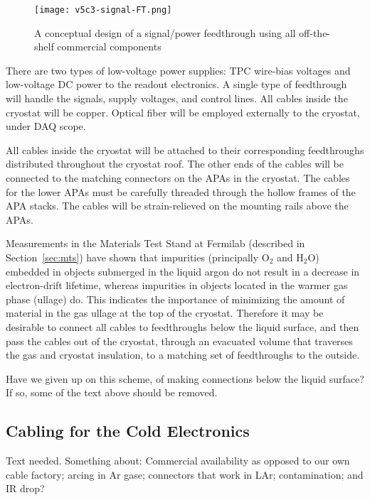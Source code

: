 \begin{figure}[htbp]
\centering
\texttt{[image: v5c3-signal-FT.png]}
\caption[Conceptual design of signal/power feedthrough]{A conceptual design of a signal/power feedthrough using all off-the-shelf commercial components}
\label{fig:ce_feedthrough}
\end{figure}

There are two types of low-voltage power supplies:
TPC wire-bias voltages and low-voltage DC power to the readout electronics.
A single type of feedthrough will handle the signals, supply voltages, and control lines.
All cables inside the cryostat will be copper.
Optical fiber will be employed externally to the cryostat, under DAQ scope.

All cables inside the cryostat will be attached to their corresponding feedthroughs distributed throughout the cryostat roof.
The other ends of the cables will be connected to the matching connectors on the APAs in the cryostat.
The cables for the lower APAs must be carefully threaded through the hollow frames of the APA stacks.
The cables will be strain-relieved on the  mounting rails above the APAs. 

Measurements in the Materials Test Stand at Fermilab (described in Section~\ref{sec:mts})
have shown that impurities (principally O$_2$ and H$_2$O) embedded in objects submerged in the liquid argon do not result
in a decrease in electron-drift lifetime, whereas impurities in objects located in the warmer gas phase (ullage) do.
This indicates the importance of minimizing the amount of material in the gas ullage at the top of the cryostat.
Therefore it may be desirable to connect all cables to feedthroughs below the liquid surface,
and then pass the cables out of the cryostat, through an evacuated volume that traverses the gas and cryostat insulation,
to a matching set of feedthroughs to the outside. 

\begin{editornote}
  Have we given up on this scheme, of making connections below the liquid surface?
  If so, some of the text above should be removed.
\end{editornote}

%
\subsection{Cabling for the Cold Electronics }
\label{subsec:ce_feedthrough_cable}

\begin{editornote}
  Text needed.
  Something about: Commercial availability as opposed to our own cable factory;
  arcing in Ar gase; connectors that work in LAr; contamination; and IR drop?
\end{editornote}

